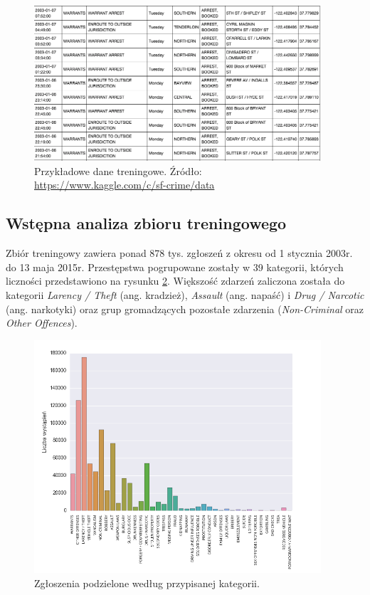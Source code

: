 \documentclass[11pt]{article} %
\begin{document}
\begin{figure}[!h]
  \centering
    \includegraphics[width=0.95\textwidth]{images/train_data.png}
  \caption{Przykładowe dane treningowe. Źródło: \protect\url{https://www.kaggle.com/c/sf-crime/data} } \label{fig:train_data}
\end{figure}



\subsection{Wstępna analiza zbioru treningowego}

Zbiór treningowy zawiera ponad 878 tys. zgłoszeń z okresu od 1 stycznia 2003r. do 13 maja 2015r. Przestępstwa pogrupowane zostały w 39 kategorii, których liczności przedstawiono na rysunku \ref{fig:categories}. Większość zdarzeń zaliczona została do kategorii \textit{Larency / Theft} (ang. kradzież), \textit{Assault} (ang. napaść) i \textit{Drug / Narcotic} (ang. narkotyki) oraz grup gromadzących pozostałe zdarzenia (\textit{Non-Criminal} oraz \textit{Other Offences}). 

\begin{figure}[!h]
  \centering
    \includegraphics[width=0.95\textwidth]{images/categories}
  \caption{Zgłoszenia podzielone według przypisanej kategorii.} \label{fig:categories}
\end{figure}
\end{document}
